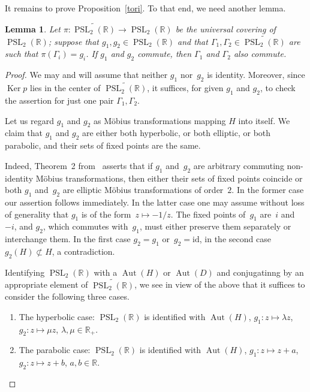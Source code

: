\documentclass[11pt]{amsart}
\newcommand*{\R}{{\mathbb R}}
\newcommand*{\uPSL}{{\widetilde{\PSL_2(\R)}}}
\DeclareMathOperator{\Aut}{Aut}
\DeclareMathOperator{\Ker}{Ker}
\DeclareMathOperator{\PSL}{PSL}
\newtheorem{lemma}[proposition]{Lemma}
\theoremstyle{remark}
\theoremstyle{definition}
\begin{document}
It remains to prove Proposition~\ref{tori}. To that end, we need another
lemma. 


\begin{lemma}\label{commutators}
Let $\pi\colon \uPSL\to\PSL_2(\R)$ be the universal covering
of~$\PSL_2(\R)$; suppose that $g_1,g_2\in\PSL_2(\R)$ and that
$\Gamma_1,\Gamma_2\in\uPSL$ are such that $\pi(\Gamma_i)=g_i$.  If
$g_1$ and $g_2$ commute, then $\Gamma_1$ and $\Gamma_2$ also commute.
\end{lemma}

\begin{proof}
We may and will assume that neither $g_1$ nor~$g_2$ is identity.
Moreover, since $\Ker p$ lies in the center of $\uPSL$, it suffices,
for given $g_1$ and $g_2$, to check the assertion for just one pair
$\Gamma_1,\Gamma_2$.
  
Let us regard $g_1$ and $g_2$ as M\"obius transformations mapping $H$
into itself. We claim that $g_1$ and $g_2$ are either both hyperbolic,
or both elliptic, or both parabolic, and their sets of fixed points
are the same.

Indeed, Theorem~2 from~\cite[Chapter~I, 9F]{Lehner} asserts that if
$g_1$ and~$g_2$ are arbitrary commuting non-identity M\"obius
transformations, then either their sets of fixed points coincide or
both $g_1$ and~$g_2$ are elliptic M\"obius transformations of
order~$2$.  In the former case our assertion follows immediately. In
the latter case one may assume without loss of generality that $g_1$
is of the form~$z\mapsto-1/z$. The fixed points of~$g_1$ are~$i$
and~$-i$, and $g_2$, which commutes with~$g_1$, must either preserve
them separately or interchange them. In the first case $g_2=g_1$
or~$g_2=\mathrm{id}$, in the second case $g_2(H)\not\subset H$, a
contradiction.

Identifying $\PSL_2(\R)$ with a $\Aut(H)$ or $\Aut(D)$ and
conjugatinng by an appropriate element of $\uPSL$, we see in view of the
above that it suffices to consider the following three cases.

\begin{enumerate}
\item\label{i:h} The hyperbolic case: $\PSL_2(\R)$ is identified with
  $\Aut(H)$, $g_1\colon z\mapsto \lambda z$, $g_2\colon z\mapsto \mu
  z$, $\lambda, \mu\in\R_+$.

\item\label{i:p} The parabolic case: $\PSL_2(\R)$ is identified with
  $\Aut(H)$, $g_1\colon z\mapsto z+a$, $g_2\colon z\mapsto z+b$,
  $a,b\in\R$.


\end{enumerate}
\end{proof}
\end{document}
